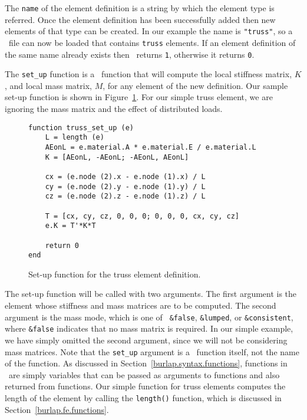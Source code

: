 The {\tt name} of the element definition is a string by which the
element type is referred.  Once the element definition has been
successfully added then new elements of that type can be created.  In
our example the name is {\tt "truss"}, so a \felt\ file can now be
loaded that contains {\tt truss} elements.  If an element definition
of the same name already exists then \adddef\ returns {\tt 1},
otherwise it returns {\tt 0}.

The {\tt set\_up} function is a \burlap\ function that will compute
the local stiffness matrix, $K$, and local mass matrix, $M$, for any
element of the new definition.  Our sample set-up function is shown in
Figure~\ref{burlap.truss.setup}.  For our simple truss element, we are
ignoring the mass matrix and the effect of distributed loads.

\begin{figure}[htbp]
\begin{center}
\begin{verbatim}
function truss_set_up (e)
    L = length (e)
    AEonL = e.material.A * e.material.E / e.material.L
    K = [AEonL, -AEonL; -AEonL, AEonL]

    cx = (e.node (2).x - e.node (1).x) / L
    cy = (e.node (2).y - e.node (1).y) / L
    cz = (e.node (2).z - e.node (1).z) / L

    T = [cx, cy, cz, 0, 0, 0; 0, 0, 0, cx, cy, cz]
    e.K = T'*K*T

    return 0
end
\end{verbatim}
\caption{Set-up function for the truss element definition.}
\label{burlap.truss.setup}
\end{center}
\end{figure}

The set-up function will be called with two arguments.  The first
argument is the element whose stiffness and mass matrices are to be
computed.  The second argument is the mass mode, which is one of {\tt
\&false}, {\tt \&lumped}, or {\tt \&consistent}, where {\tt \&false}
indicates that no mass matrix is required.  In our simple example, we
have simply omitted the second argument, since we will not be
considering mass matrices.  Note that the {\tt set\_up} argument is a
\burlap\ function itself, not the name of the function.  As discussed
in Section~\ref{burlap.syntax.functions}, functions in \burlap\ are
simply variables that can be passed as arguments to functions and also
returned from functions.  Our simple function for truss elements
computes the length of the element by calling the {\tt length()}
function, which is discussed in Section~\ref{burlap.fe.functions}.

